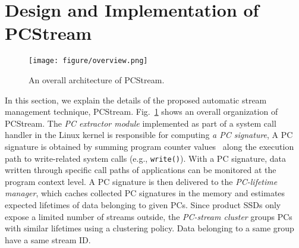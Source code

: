 \section{Design and Implementation of \textsf{PCStream}}

\begin{figure}[t]
	\centering
	\texttt{[image: figure/overview.png]}
	\caption{An overall architecture of \textsf{\small PCStream}.}
	\label{fig:architecture}
\end{figure}

In this section, we explain the details of the proposed automatic stream
management technique, \textsf{\small PCStream}.
Fig.~\ref{fig:architecture} shows an overall organization of \textsf{\small
PCStream}. The \textit{PC extractor module} implemented as part of a system
call handler in the Linux kernel is responsible for computing \textit{a PC
signature},  A PC
signature is obtained by summing program counter values~\cite{PC} along the
execution path to write-related system calls (e.g., {\tt write()}).  With a PC
signature, data written through specific call paths of applications can be
monitored at the program context level.  A PC signature is then delivered to
the \textit{PC-lifetime manager}, which caches collected PC signatures in the
memory and estimates expected lifetimes of data belonging to given PCs.  Since
product SSDs only expose a limited number of streams outside, the
\textit{PC-stream cluster} groups PCs with similar lifetimes using a clustering 
policy. Data belonging to a same group have a same stream ID.


